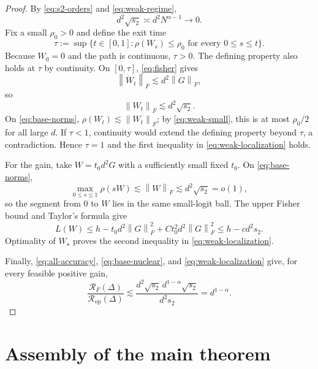 \documentclass[11pt]{article}
\theoremstyle{definition}
\newcommand{\normF}[1]{\left\lVert #1\right\rVert_F}
\begin{document}
\begin{proof}
By \eqref{eq:s2-orders} and \eqref{eq:weak-regime},
\begin{equation}
 d^2\sqrt{s_2}\asymp d^2N^{\alpha-1}\longrightarrow0.
 \label{eq:weak-small}
\end{equation}
Fix a small $\rho_0>0$ and define the exit time
\[
 \tau:=\sup\{t\in[0,1]:\rho(W_s)\leq\rho_0
 \text{ for every }0\leq s\leq t\}.
\]
Because $W_0=0$ and the path is continuous, $\tau>0$.  The defining
property also holds at $\tau$ by continuity.  On $[0,\tau]$,
\eqref{eq:fisher} gives
\[
 \normF{\dot W_t}\lesssim d^2\normF{G},
\]
so
\[
 \normF{W_t}\lesssim d^2\sqrt{s_2}.
\]
On \eqref{eq:base-norms},
$\rho(W_t)\lesssim\normF{W_t}$; by \eqref{eq:weak-small}, this is at
most $\rho_0/2$ for all large $d$.  If $\tau<1$, continuity would
extend the defining property beyond $\tau$, a contradiction.  Hence
$\tau=1$ and the first inequality in \eqref{eq:weak-localization}
holds.

For the gain, take $W=t_0d^2G$ with a sufficiently small fixed $t_0$.
On \eqref{eq:base-norms},
\[
 \max_{0\leq s\leq1}\rho(sW)
 \lesssim\normF{W}\lesssim d^2\sqrt{s_2}=o(1),
\]
so the segment from $0$ to $W$ lies in the same small-logit ball.  The
upper Fisher bound and Taylor's formula give
\[
 L(W)
 \leq h-t_0d^2\normF{G}^2
 +Ct_0^2d^2\normF{G}^2
 \leq h-cd^2s_2.
\]
Optimality of $W_\star$ proves the second inequality in
\eqref{eq:weak-localization}.

Finally, \eqref{eq:all-accuracy}, \eqref{eq:base-nuclear}, and
\eqref{eq:weak-localization} give, for every feasible positive gain,
\[
 \frac{\mathcal R_F(\Delta)}
 {\mathcal R_{\mathrm{op}}(\Delta)}
 \lesssim
 \frac{d^2\sqrt{s_2}\,
 d^{1-\alpha}\sqrt{s_2}}{d^2s_2}
 =d^{1-\alpha}.
\]
\end{proof}

\section{Assembly of the main theorem}
\end{document}
